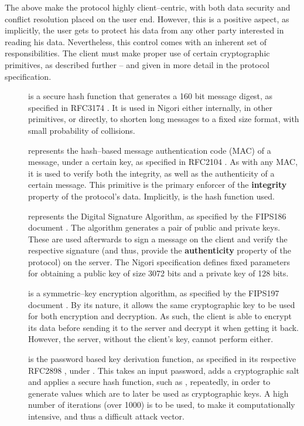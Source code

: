 
The above make the protocol highly client--centric, with both data security and conflict resolution placed on the user end.
However, this is a positive aspect, as implicitly, the user gets to protect his data from any other party interested in reading his data.
Nevertheless, this control comes with an inherent set of responsibilities.
The client must make proper use of certain cryptographic primitives, as described further -- and given in more detail in the protocol specification.

\begin{description}
  \item[] is a secure hash function that generates a 160 bit message digest, as specified in RFC3174 \cite{RFC3174}.
  It is used in Nigori either internally, in other primitives, or directly, to shorten long messages to a fixed size format, with small probability of collisions.

  \item[] represents the hash--based message authentication code (MAC) of a message, under a certain key, as specified in RFC2104 \cite{RFC2104}.
  As with any MAC, it is used to verify both the integrity, as well as the authenticity of a certain message.
  This primitive is the primary enforcer of the \textbf{integrity} property of the protocol's data.
  Implicitly,  is the hash function used.

  \item[] represents the Digital Signature Algorithm, as specified by the FIPS186 document \cite{DSA}.
  The algorithm generates a pair of public and private keys.
  These are used afterwards to sign a message on the client and verify the respective signature (and thus, provide the \textbf{authenticity} property of the protocol) on the server.
  The Nigori specification defines fixed parameters for obtaining a public key of size 3072 bits and a private key of 128 bits.

  \item[] is a symmetric--key encryption algorithm, as specified by the FIPS197 document \cite{AES}.
  By its nature, it allows the same cryptographic key to be used for both encryption and decryption.
  As such, the client is able to encrypt its data before sending it to the server and decrypt it when getting it back.
  However, the server, without the client's key, cannot perform either.

  \item[] is the password based key derivation function, as specified in its respective RFC2898 \cite{RFC2898}, under .
  This takes an input password, adds a cryptographic salt and applies a secure hash function, such as , repeatedly, in order to generate values which are to later be used as cryptographic keys.
  A high number of iterations (over 1000) is to be used, to make it computationally intensive, and thus a difficult attack vector.
\end{description}

